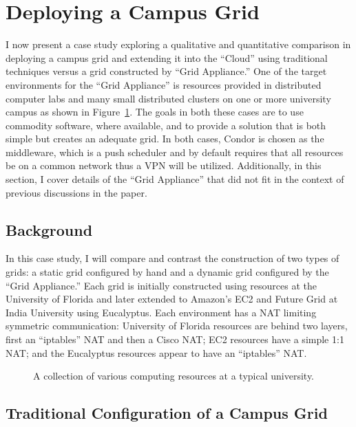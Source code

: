 \section{Deploying a Campus Grid}
\label{case_study}

I now present a case study exploring a qualitative and quantitative comparison
in deploying a campus grid and extending it into the ``Cloud'' using
traditional techniques versus a grid constructed by ``Grid Appliance.''  One of
the target environments for the ``Grid Appliance'' is resources provided in
distributed computer labs and many small distributed clusters on one or more
university campus as shown in Figure~\ref{fig:unconnected}.  The goals in both
these cases are to use commodity software, where available, and to provide a
solution that is both simple but creates an adequate grid.  In both cases,
Condor is chosen as the middleware, which is a push scheduler and by default
requires that all resources be on a common network thus a VPN will be utilized.
Additionally, in this section, I cover details of the ``Grid Appliance'' that
did not fit in the context of previous discussions in the paper.

\subsection{Background}

In this case study, I will compare and contrast the construction of two types
of grids:  a static grid configured by hand and a dynamic grid configured by
the ``Grid Appliance.''  Each grid is initially constructed using resources at
the University of Florida and later extended to Amazon's EC2 and Future Grid at
India University using Eucalyptus.  Each environment has a NAT limiting
symmetric communication: University of Florida resources are behind two layers,
first an ``iptables'' NAT and then a Cisco NAT; EC2 resources have a simple 1:1
NAT; and the Eucalyptus resources appear to have an ``iptables'' NAT.

\begin{figure}
\centering
{}
\caption{A collection of various computing resources at a typical university.}
\label{fig:unconnected}
\end{figure}

\subsection{Traditional Configuration of a Campus Grid}

